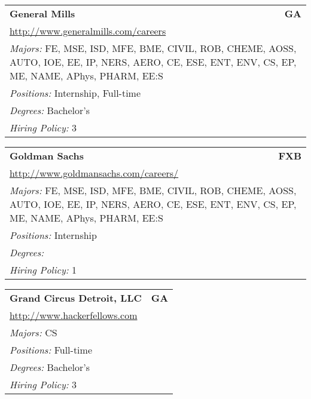 \documentclass[twoside]{article}
\begin{document}
\begin{center}
\begin{multicols}{3}
\begin{FlushLeft}
\begin{minipage}{\columnwidth}\begin{tabularx}{.95\columnwidth}{Xr}
                 {\Large\bf General Mills} & {\Large\bf GA}\\
    \multicolumn{2}{p{.95\columnwidth}}{\url{http://www.generalmills.com/careers}}\\
    \multicolumn{2}{p{.95\columnwidth}}{\emph{Majors:} FE, MSE, ISD, MFE, BME, CIVIL, ROB, CHEME, AOSS, AUTO, IOE, EE, IP, NERS, AERO, CE, ESE, ENT, ENV, CS, EP, ME, NAME, APhys, PHARM, EE:S}\\
    \multicolumn{2}{p{.95\columnwidth}}{\emph{Positions:} Internship, Full-time}\\
    \multicolumn{2}{p{.95\columnwidth}}{\emph{Degrees:} Bachelor's}\\
    \multicolumn{2}{p{.95\columnwidth}}{\emph{Hiring Policy:} 3}\\
    \end{tabularx}
    
\end{minipage}
 
\begin{minipage}{\columnwidth}\begin{tabularx}{.95\columnwidth}{Xr}
                 {\Large\bf Goldman Sachs} & {\Large\bf FXB}\\
    \multicolumn{2}{p{.95\columnwidth}}{\url{http://www.goldmansachs.com/careers/}}\\
    \multicolumn{2}{p{.95\columnwidth}}{\emph{Majors:} FE, MSE, ISD, MFE, BME, CIVIL, ROB, CHEME, AOSS, AUTO, IOE, EE, IP, NERS, AERO, CE, ESE, ENT, ENV, CS, EP, ME, NAME, APhys, PHARM, EE:S}\\
    \multicolumn{2}{p{.95\columnwidth}}{\emph{Positions:} Internship}\\
    \multicolumn{2}{p{.95\columnwidth}}{\emph{Degrees:} }\\
    \multicolumn{2}{p{.95\columnwidth}}{\emph{Hiring Policy:} 1}\\
    \end{tabularx}
    
\end{minipage}
 
\begin{minipage}{\columnwidth}\begin{tabularx}{.95\columnwidth}{Xr}
                 {\Large\bf Grand Circus Detroit, LLC} & {\Large\bf GA}\\
    \multicolumn{2}{p{.95\columnwidth}}{\url{http://www.hackerfellows.com}}\\
    \multicolumn{2}{p{.95\columnwidth}}{\emph{Majors:} CS}\\
    \multicolumn{2}{p{.95\columnwidth}}{\emph{Positions:} Full-time}\\
    \multicolumn{2}{p{.95\columnwidth}}{\emph{Degrees:} Bachelor's}\\
    \multicolumn{2}{p{.95\columnwidth}}{\emph{Hiring Policy:} 3}\\
    \end{tabularx}
    

\end{minipage}
\end{FlushLeft}
\end{multicols}
\end{center}
\end{document}
